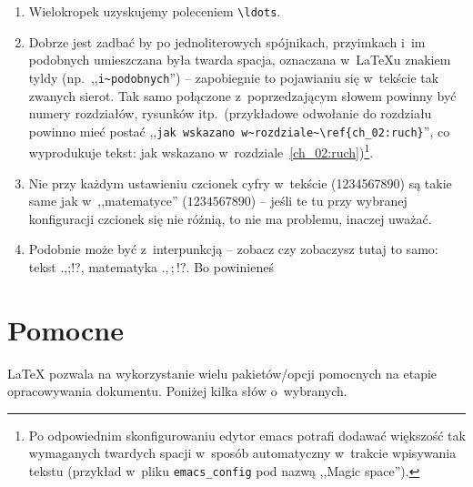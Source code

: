 \begin{enumerate}
\item Wielokropek uzyskujemy poleceniem \texttt{\textbackslash ldots}.

\item Dobrze jest zadbać by po jednoliterowych spójnikach, przyimkach i~im podobnych umieszczana była twarda spacja, oznaczana w~\LaTeX{}u znakiem tyldy (np.\ ,,\verb+i~podobnych+'') -- zapobiegnie to pojawianiu się w~tekście tak zwanych sierot. Tak samo połączone z~poprzedzającym słowem powinny być numery rozdziałów, rysunków itp.\ (przykładowe odwołanie do rozdziału powinno mieć postać ,,\verb+jak wskazano w~rozdziale~\ref{ch_02:ruch}+'', co wyprodukuje tekst: jak wskazano w~rozdziale~\ref{ch_02:ruch})\footnote{Po odpowiednim skonfigurowaniu edytor emacs potrafi dodawać większość tak wymaganych twardych spacji w~sposób automatyczny w~trakcie wpisywania tekstu (przykład w~pliku \texttt{emacs\_config} pod nazwą ,,Magic space'').}.

\item Nie przy każdym ustawieniu czcionek cyfry w~tekście (1234567890) są takie same jak w~,,matematyce'' ($1234567890$) -- jeśli te tu przy wybranej konfiguracji czcionek się nie różnią, to nie ma problemu, inaczej uważać.

\item Podobnie może być z~interpunkcją -- zobacz czy zobaczysz tutaj to samo: tekst .,;!?, matematyka $.,;!?$. Bo powinieneś \smiley

\end{enumerate}


\section{Pomocne}

\LaTeX{} pozwala na wykorzystanie wielu pakietów/opcji pomocnych na etapie opracowywania dokumentu. Poniżej kilka słów o~wybranych. \vspace{-4.5mm}

